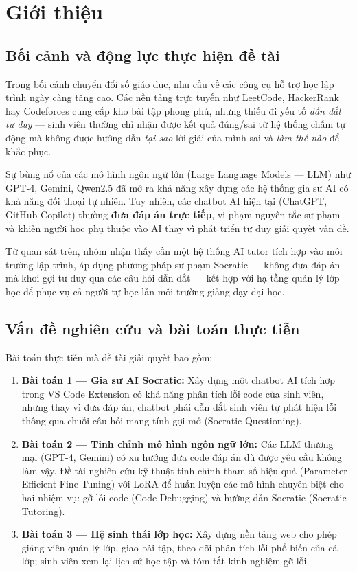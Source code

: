 \chapter{Giới thiệu}
\label{chap:introduction}

\section{Bối cảnh và động lực thực hiện đề tài}

Trong bối cảnh chuyển đổi số giáo dục, nhu cầu về các công cụ hỗ trợ học lập trình ngày càng tăng cao. Các nền tảng trực tuyến như LeetCode, HackerRank hay Codeforces cung cấp kho bài tập phong phú, nhưng thiếu đi yếu tố \textit{dẫn dắt tư duy} --- sinh viên thường chỉ nhận được kết quả đúng/sai từ hệ thống chấm tự động mà không được hướng dẫn \textit{tại sao} lời giải của mình sai và \textit{làm thế nào} để khắc phục.

Sự bùng nổ của các mô hình ngôn ngữ lớn (Large Language Models --- LLM) như GPT-4, Gemini, Qwen2.5 đã mở ra khả năng xây dựng các hệ thống gia sư AI có khả năng đối thoại tự nhiên. Tuy nhiên, các chatbot AI hiện tại (ChatGPT, GitHub Copilot) thường \textbf{đưa đáp án trực tiếp}, vi phạm nguyên tắc sư phạm và khiến người học phụ thuộc vào AI thay vì phát triển tư duy giải quyết vấn đề.

Từ quan sát trên, nhóm nhận thấy cần một hệ thống AI tutor tích hợp vào môi trường lập trình, áp dụng phương pháp sư phạm Socratic --- không đưa đáp án mà khơi gợi tư duy qua các câu hỏi dẫn dắt --- kết hợp với hạ tầng quản lý lớp học để phục vụ cả người tự học lẫn môi trường giảng dạy đại học.

\section{Vấn đề nghiên cứu và bài toán thực tiễn}

Bài toán thực tiễn mà đề tài giải quyết bao gồm:

\begin{enumerate}
    \item \textbf{Bài toán 1 --- Gia sư AI Socratic:} Xây dựng một chatbot AI tích hợp trong VS Code Extension có khả năng phân tích lỗi code của sinh viên, nhưng thay vì đưa đáp án, chatbot phải dẫn dắt sinh viên tự phát hiện lỗi thông qua chuỗi câu hỏi mang tính gợi mở (Socratic Questioning).
    \item \textbf{Bài toán 2 --- Tinh chỉnh mô hình ngôn ngữ lớn:} Các LLM thương mại (GPT-4, Gemini) có xu hướng đưa code đáp án dù được yêu cầu không làm vậy. Đề tài nghiên cứu kỹ thuật tinh chỉnh tham số hiệu quả (Parameter-Efficient Fine-Tuning) với LoRA để huấn luyện các mô hình chuyên biệt cho hai nhiệm vụ: gỡ lỗi code (Code Debugging) và hướng dẫn Socratic (Socratic Tutoring).
    \item \textbf{Bài toán 3 --- Hệ sinh thái lớp học:} Xây dựng nền tảng web cho phép giảng viên quản lý lớp, giao bài tập, theo dõi phân tích lỗi phổ biến của cả lớp; sinh viên xem lại lịch sử học tập và tóm tắt kinh nghiệm gỡ lỗi.
\end{enumerate}

